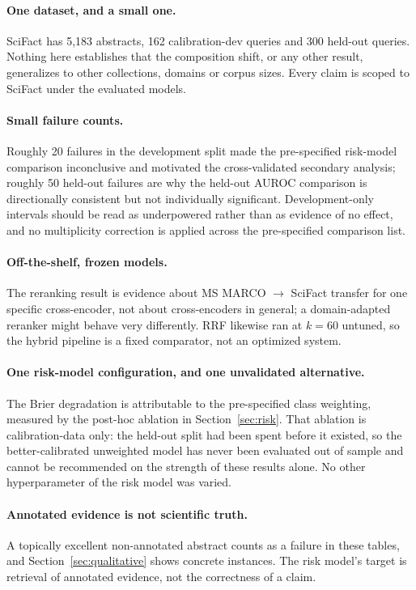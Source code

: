\documentclass[11pt,a4paper]{article}
\begin{document}
\paragraph{One dataset, and a small one.} SciFact has 5{,}183 abstracts, 162 calibration-dev
queries and 300 held-out queries. Nothing here establishes that the composition shift, or any
other result, generalizes to other collections, domains or corpus sizes. Every claim is scoped
to SciFact under the evaluated models.

\paragraph{Small failure counts.} Roughly 20 failures in the development split made the
pre-specified risk-model comparison inconclusive and motivated the cross-validated secondary
analysis; roughly 50 held-out failures are why the held-out AUROC comparison is directionally
consistent but not individually significant. Development-only intervals should be read as
underpowered rather than as evidence of no effect, and no multiplicity correction is applied
across the pre-specified comparison list.

\paragraph{Off-the-shelf, frozen models.} The reranking result is evidence about
MS MARCO $\rightarrow$ SciFact transfer for one specific cross-encoder, not about cross-encoders
in general; a domain-adapted reranker might behave very differently. RRF likewise ran at
$k = 60$ untuned, so the hybrid pipeline is a fixed comparator, not an optimized system.

\paragraph{One risk-model configuration, and one unvalidated alternative.} The Brier degradation
is attributable to the pre-specified class weighting, measured by the post-hoc ablation in
Section~\ref{sec:risk}. That ablation is calibration-data only: the held-out split had been spent
before it existed, so the better-calibrated unweighted model has never been evaluated out of
sample and cannot be recommended on the strength of these results alone. No other hyperparameter
of the risk model was varied.

\paragraph{Annotated evidence is not scientific truth.} A topically excellent non-annotated
abstract counts as a failure in these tables, and Section~\ref{sec:qualitative} shows concrete
instances. The risk model's target is retrieval of annotated evidence, not the correctness of a
claim.
\end{document}
